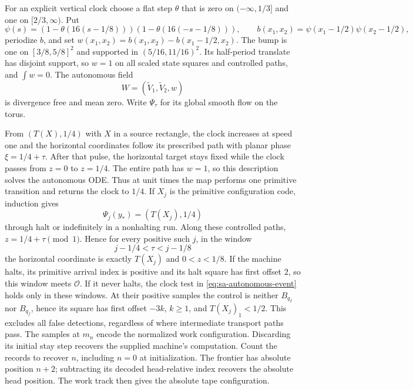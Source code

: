 For an explicit vertical clock choose a flat step $\theta$ that is zero
on $(-\infty,1/3]$ and one on $[2/3,\infty)$.  Put
\[
 \psi(s)=(1-\theta(16(s-1/8)))
             (1-\theta(16(-s-1/8))),\qquad
 b(x_1,x_2)=\psi(x_1-1/2)\psi(x_2-1/2),
\]
periodize $b$, and set $w(x_1,x_2)=b(x_1,x_2)-b(x_1-1/2,x_2)$.
The bump is one on $[3/8,5/8]^2$ and supported in
$(5/16,11/16)^2$.  Its half-period translate has disjoint support,
so $w=1$ on all scaled state squares and controlled paths, and $\int w=0$.
The autonomous field
\begin{equation}\label{eq:sa-autonomous-W}
 W=(\widetilde V_1,\widetilde V_2,w)
\end{equation}
is divergence free and mean zero.  Write $\Psi_\tau$ for its global
smooth flow on the torus.

From $(T(X),1/4)$ with $X$ in a source rectangle, the clock increases
at speed one and the horizontal coordinates follow its prescribed path
with planar phase $\xi=1/4+\tau$.  After that pulse, the horizontal target
stays fixed while the clock passes from $z=0$ to $z=1/4$.  The entire
path has $w=1$, so this description solves the autonomous ODE.  Thus at
unit times the map performs one primitive transition and returns the clock
to $1/4$.  If $X_j$ is the primitive configuration code, induction gives
\begin{equation}\label{eq:sa-autonomous-samples}
       \Psi_j(y_*)=(T(X_j),1/4)
\end{equation}
through halt or indefinitely in a nonhalting run.
Along these controlled paths, $z=1/4+\tau\pmod1$.  Hence for every
positive such $j$, in the window
\begin{equation}\label{eq:sa-autonomous-window}
                  j-1/4<\tau<j-1/8
\end{equation}
the horizontal coordinate is exactly $T(X_j)$ and $0<z<1/8$.
If the machine halts, its primitive arrival index is positive and its
halt square has first offset $2$, so this window meets $\mathcal O$.
If it never halts, the clock test in \eqref{eq:sa-autonomous-event} holds
only in these windows.  At their positive samples the control is neither
$B_{q_I}$ nor $B_{q_f}$, hence its square has first offset $-3k$, $k\ge1$,
and $T(X_j)_1<1/2$.  This excludes all false detections, regardless of
where intermediate transport paths pass.
The samples at $m_n$ encode the normalized work configuration.
Discarding its initial stay step recovers the supplied machine's
computation.  Count the records to recover $n$, including $n=0$ at
initialization.  The frontier has absolute position $n+2$; subtracting
its decoded head-relative index recovers the absolute head position.
The work track then gives the absolute tape configuration.

